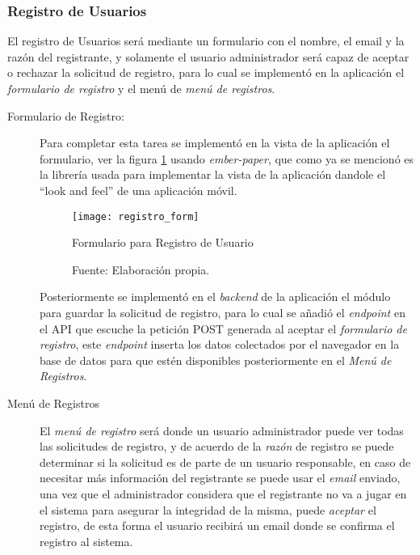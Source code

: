 \subsubsection{Registro de Usuarios}

El registro de Usuarios será mediante un formulario con el nombre, el email y la razón del registrante, y solamente el usuario administrador será capaz de aceptar o rechazar la solicitud de registro, para lo cual se implementó en la aplicación el \emph{formulario de registro} y el menú de \emph{menú de registros}. \\



\begin{description}
  \item[Formulario de Registro:] Para completar esta tarea se implementó en la vista de la aplicación el formulario, ver la figura \ref{fig:registro_form} usando \emph{ember-paper}, que como ya se mencionó es la librería usada para implementar la vista de la aplicación dandole el ``look and feel'' de una aplicación móvil. \\

  \begin{figure}[H]
        \begin{center}
          \texttt{[image: registro\_form]}

          \caption{Formulario para Registro de Usuario}
          \label{fig:registro_form}
          \caption*{Fuente: Elaboración propia.}
        \end{center}
  \end{figure}


  Posteriormente se implementó en el \emph{backend} de la aplicación el módulo para guardar la solicitud de registro, para lo cual se  añadió el \emph{endpoint} en el API que escuche la petición POST generada al aceptar el \emph{formulario de registro}, este \emph{endpoint} inserta los datos colectados por el navegador en la base de datos para que estén disponibles posteriormente en el \emph{Menú de Registros}.\\


  \item[Menú de Registros] El \emph{menú de registro} será donde un usuario administrador puede ver todas las solicitudes de registro, y de acuerdo de la \emph{razón} de registro se puede determinar si la solicitud es de parte de un usuario responsable, en caso de necesitar más información del registrante se puede usar el \emph{email} enviado, una vez que el administrador considera que el registrante no va a jugar en el sistema para asegurar la integridad de la misma, puede \emph{aceptar} el registro, de esta forma el usuario recibirá un email donde se confirma el registro al sistema.\\





\end{description}


